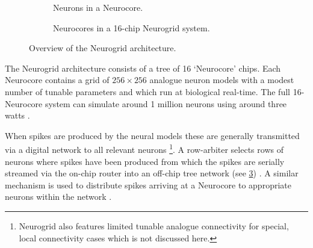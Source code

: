 				
				\begin{figure}
					\begin{subfigure}[b]{0.39\textwidth}
						\center
						
						\caption{Neurons in a Neurocore.}
						\label{fig:neurogrid-chip}
					\end{subfigure}
					\begin{subfigure}[b]{0.59\textwidth}
						\center
						
						\caption{Neurocores in a 16-chip Neurogrid system.}
						\label{fig:neurogrid-topology}
					\end{subfigure}
					
					\caption{Overview of the Neurogrid architecture.}
					\label{fig:neurogrid-arch-overview}
				\end{figure}
				
				The Neurogrid architecture consists of a tree of 16 `Neurocore' chips.
				Each Neurocore contains a grid of $256 \times 256$ analogue neuron
				models with a modest number of tunable parameters and which run at
				biological real-time. The full 16-Neurocore system can simulate around 1
				million neurons using around three watts \cite{benjamin14}.
				
				When spikes are produced by the neural models these are generally
				transmitted via a digital network to all relevant neurons
				\footnote{Neurogrid also features limited tunable analogue connectivity
				for special, local connectivity cases which is not discussed here.}. A
				row-arbiter selects rows of neurons where spikes have been produced from
				which the spikes are serially streamed via the on-chip router into an
				off-chip tree network (see \ref{fig:neurogrid-arch-overview})
				\cite{boahen04}. A similar mechanism is used to distribute spikes
				arriving at a Neurocore to appropriate neurons within the network
				\cite{boahen04receiver}.
				
